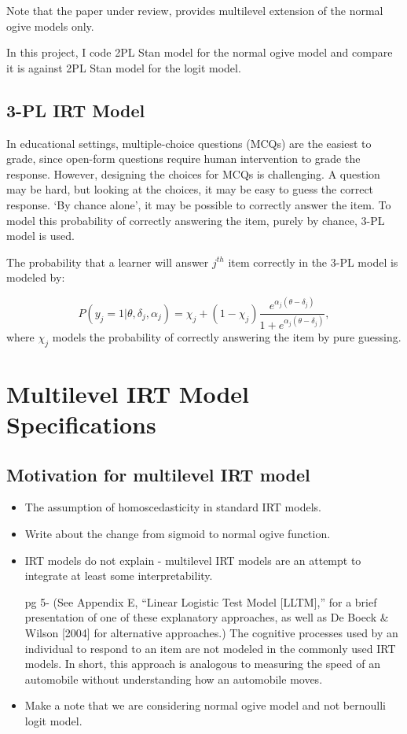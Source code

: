 \documentclass[12pt]{article}
\begin{document}
Note that the paper under review, \cite{fox2001bayesian} provides multilevel extension of the normal ogive models only.

In this project, I code 2PL Stan model for the normal ogive model and compare it is against 2PL Stan model for the logit model.

\subsection{3-PL IRT Model}
In educational settings, multiple-choice questions (MCQs) are the easiest to grade, since open-form questions require human intervention to grade the response. However, designing the choices for MCQs is challenging. A question may be hard, but looking at the choices, it may be easy to guess the correct response. `By chance alone', it may be possible to correctly answer the item. To model this probability of correctly answering the item, purely by chance, 3-PL model is used.

The probability that a learner will answer $j^{th}$ item correctly in the 3-PL model is modeled by:

\begin{equation}\label{eq:3pl}
    P(y_j=1|\theta, \delta_j, \alpha_j) = \chi_j + (1 - \chi_j) \frac{e^{\alpha_j(\theta - \delta_j)}}{1+e^{\alpha_j(\theta - \delta_j)}},
\end{equation}
where $\chi_j$ models the probability of correctly answering the item by pure guessing.


\section{Multilevel IRT Model Specifications} \label{sec:mlirt}
\subsection{Motivation for multilevel IRT model}
\begin{itemize}
    \item The assumption of homoscedasticity in standard IRT models.
    \item Write about the change from sigmoid to normal ogive function.
    \item IRT models do not explain - multilevel IRT models are an attempt to integrate at least some interpretability.
    
    pg 5- (See Appendix E, “Linear Logistic Test Model [LLTM],” for a brief presentation of one of these explanatory approaches, as well as De Boeck \& Wilson [2004] for alternative approaches.) The cognitive processes used by an individual to respond to an item are not modeled in the commonly used IRT models. In short, this approach is analogous to measuring the speed of an automobile without understanding how an automobile moves. \cite{de2013theory}
    
    \item Make a note that we are considering normal ogive model and not bernoulli logit model.
\end{itemize}
\end{document}
